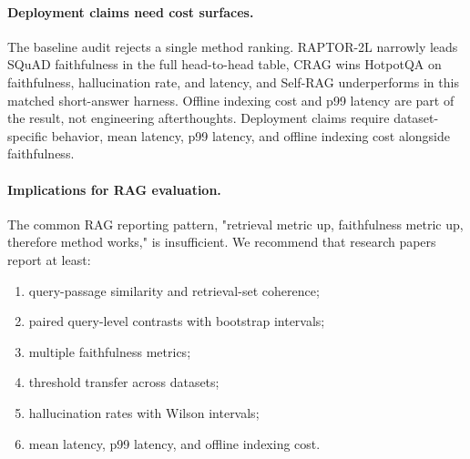 \paragraph{Deployment claims need cost surfaces.}
The baseline audit rejects a single method ranking. RAPTOR-2L narrowly leads
SQuAD faithfulness in the full head-to-head table, CRAG wins HotpotQA on
faithfulness, hallucination rate, and latency, and Self-RAG underperforms in
this matched short-answer harness. Offline indexing cost and p99 latency are
part of the result, not engineering afterthoughts. Deployment claims require
dataset-specific behavior, mean latency, p99 latency, and offline indexing
cost alongside faithfulness.

\paragraph{Implications for RAG evaluation.}
The common RAG reporting pattern, "retrieval metric up, faithfulness metric up,
therefore method works," is insufficient. We recommend that research papers
report at least:
\begin{enumerate}[leftmargin=1.6em,itemsep=2pt,topsep=2pt]
  \item query-passage similarity and retrieval-set coherence;
  \item paired query-level contrasts with bootstrap intervals;
  \item multiple faithfulness metrics;
  \item threshold transfer across datasets;
  \item hallucination rates with Wilson intervals;
  \item mean latency, p99 latency, and offline indexing cost.
\end{enumerate}
